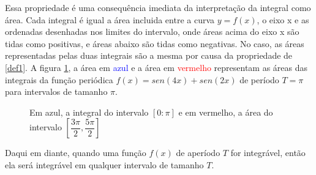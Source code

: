 Essa propriedade é uma consequência imediata da interpretação da integral como
área. Cada integral é igual a área incluida entre a curva $y=f(x)$, o eixo x e
as ordenadas desenhadas nos limites do intervalo, onde áreas acima do eixo x
são tidas como positivas, e áreas abaixo são tidas como negativas. No caso,
as áreas representadas pelas duas integrais são a mesma por causa da propriedade 
de \ref{def1}. A figura \ref{fig:int_area}, a área em \textcolor{blue}{azul} e a
área em \textcolor{red}{vermelho} representam as áreas das integrais da função
periódica $f(x)=sen(4x)+sen(2x)$ de período $T=\pi$ para intervalos de tamanho $\pi$. 
\\
\begin{figure}[H]
\caption{Em azul, a integral do intervalo $[0:\pi]$ e em vermelho, a área do intervalo $[\dfrac{3\pi}{2}, \dfrac{5\pi}{2}]$}
\label{fig:int_area}
\end{figure}

Daqui em diante, quando uma função $f(x)$ de aperíodo $T$ for integrável, então
ela será integrável em qualquer intervalo de tamanho $T$.